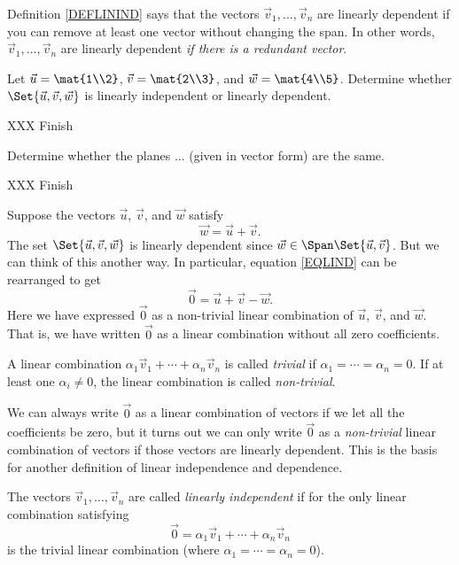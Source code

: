 Definition \ref{DEFLININD} says that the vectors $\vec v_1,\ldots,\vec v_n$ are linearly dependent
if you can remove at least one vector without changing the span. In other words, $\vec v_1,\ldots,\vec v_n$ 
are linearly dependent \emph{if there is a redundant vector}.

\begin{example}
	\label{EXLINDEP}
	Let $\vec u=\mat{1\\2}$, $\vec v=\mat{2\\3}$, and $\vec w=\mat{4\\5}$. Determine whether
	$\Set{\vec u,\vec v,\vec w}$ is linearly independent or linearly dependent.

	XXX Finish
\end{example}

\begin{example}
	Determine whether the planes ... (given in vector form) are the same.

	XXX Finish
\end{example}

Suppose the vectors $\vec u$, $\vec v$, and $\vec w$ satisfy 
\begin{equation}
	\label{EQLIND}
	\vec w=\vec u+\vec v.
\end{equation}
The set
$\Set{\vec u,\vec v,\vec w}$ is linearly dependent since $\vec w\in\Span\Set{\vec u,\vec v}$.
But we can think of this another way. In particular, equation \eqref{EQLIND} can be rearranged
to get
\[
	\vec 0=\vec u+\vec v-\vec w.
\]
Here we have expressed $\vec 0$ as a non-trivial linear combination of $\vec u$, $\vec v$, and $\vec w$.
That is, we have written $\vec 0$ as a linear combination without all zero coefficients.

\begin{definition}
	A linear combination $\alpha_1\vec v_1+\cdots+\alpha_n\vec v_n$ is called
	\emph{trivial}
	if $\alpha_1=\cdots=\alpha_n=0$. If at least one $\alpha_i\neq 0$,
	the linear combination is called \emph{non-trivial}.
\end{definition}

We can always write $\vec 0$ as a linear combination of vectors if we let all the coefficients
be zero, but it turns out we can only write $\vec 0$ as a \emph{non-trivial} linear combination
of vectors if those vectors are linearly dependent. This is the basis for another definition
of linear independence and dependence.

\begin{definition}
	\label{DEFLININDII}
	The vectors $\vec v_1,\ldots,\vec v_n$ are called \emph{linearly independent}
	if for the only linear combination satisfying
	\[
		\vec 0=\alpha_1\vec v_1+\cdots+\alpha_n\vec v_n
	\]
	is the trivial linear combination (where $\alpha_1=\cdots=\alpha_n=0$).
\end{definition}

